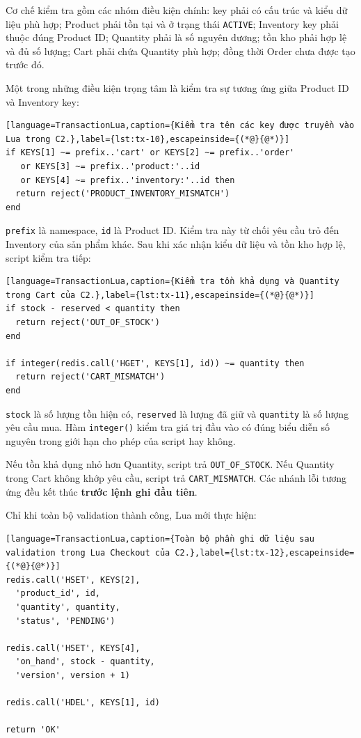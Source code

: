 Cơ chế kiểm tra gồm các nhóm điều kiện chính: key phải có cấu trúc và kiểu dữ liệu phù hợp; Product phải tồn tại và ở trạng thái \texttt{ACTIVE}; Inventory key phải thuộc đúng Product ID; Quantity phải là số nguyên dương; tồn kho phải hợp lệ và đủ số lượng; Cart phải chứa Quantity phù hợp; đồng thời Order chưa được tạo trước đó.

Một trong những điều kiện trọng tâm là kiểm tra sự tương ứng giữa Product ID và Inventory key:

\reportblockspace{72pt}
\begin{lstlisting}[language=TransactionLua,caption={Kiểm tra tên các key được truyền vào Lua trong C2.},label={lst:tx-10},escapeinside={(*@}{@*)}]
if KEYS[1] ~= prefix..'cart' or KEYS[2] ~= prefix..'order'
   or KEYS[3] ~= prefix..'product:'..id
   or KEYS[4] ~= prefix..'inventory:'..id then
  return reject('PRODUCT_INVENTORY_MISMATCH')
end
\end{lstlisting}

\texttt{prefix} là namespace, \texttt{id} là Product ID. Kiểm tra này từ chối yêu cầu trỏ đến Inventory của sản phẩm khác. Sau khi xác nhận kiểu dữ liệu và tồn kho hợp lệ, script kiểm tra tiếp:

\reportblockspace{72pt}
\begin{lstlisting}[language=TransactionLua,caption={Kiểm tra tồn khả dụng và Quantity trong Cart của C2.},label={lst:tx-11},escapeinside={(*@}{@*)}]
if stock - reserved < quantity then
  return reject('OUT_OF_STOCK')
end

if integer(redis.call('HGET', KEYS[1], id)) ~= quantity then
  return reject('CART_MISMATCH')
end
\end{lstlisting}

\texttt{stock} là số lượng tồn hiện có, \texttt{reserved} là lượng đã giữ và \texttt{quantity} là số lượng yêu cầu mua. Hàm \texttt{integer()} kiểm tra giá trị đầu vào có đúng biểu diễn số nguyên trong giới hạn cho phép của script hay không.

Nếu tồn khả dụng nhỏ hơn Quantity, script trả \texttt{OUT\_\allowbreak{}OF\_\allowbreak{}STOCK}. Nếu Quantity trong Cart không khớp yêu cầu, script trả \texttt{CART\_\allowbreak{}MISMATCH}. Các nhánh lỗi tương ứng đều kết thúc \textbf{trước lệnh ghi đầu tiên}.

Chỉ khi toàn bộ validation thành công, Lua mới thực hiện:

\reportblockspace{72pt}
\begin{lstlisting}[language=TransactionLua,caption={Toàn bộ phần ghi dữ liệu sau validation trong Lua Checkout của C2.},label={lst:tx-12},escapeinside={(*@}{@*)}]
redis.call('HSET', KEYS[2],
  'product_id', id,
  'quantity', quantity,
  'status', 'PENDING')

redis.call('HSET', KEYS[4],
  'on_hand', stock - quantity,
  'version', version + 1)

redis.call('HDEL', KEYS[1], id)

return 'OK'
\end{lstlisting}

